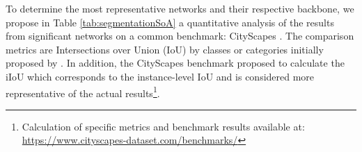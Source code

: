 To determine the most representative networks and their respective backbone, we propose in Table \ref{tab:segmentationSoA} a quantitative analysis of the results from significant networks on a common benchmark: CityScapes \cite{Cordts2016Cityscapes}. The comparison metrics are Intersections over Union (IoU) by classes or categories initially proposed by \cite{everingham2015pascal}. In addition, the CityScapes benchmark proposed to calculate the iIoU which corresponds to the instance-level IoU and is considered more representative of the actual results\footnote{Calculation of specific metrics and benchmark results available at: \url{https://www.cityscapes-dataset.com/benchmarks/}}.

\renewcommand{\arraystretch}{1.2}
\useunder{\uline}{\ul}{}
\begin{table}[h]
	\centering
	\caption[Overview of major approaches highlighting performances on CityScapes benckmark and backbones.]{Overview of major approaches highlighting performances on CityScapes benckmark \cite{Cordts2016Cityscapes} and backbones. \underline{Underlined} and \textbf{bold} respresents respectively overall second best and best. \textit{Italic} is best per backbone.}
	\label{tab:segmentationSoA}
\end{table}
